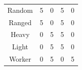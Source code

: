 \documentclass[a0,portrait]{a0poster}
\begin{document}
\begin{multicols}{2}
{\begin{center}
\begin{tabular}{|c|cc|cc|}
		Random              & 5                                      & 0                 & 5                                      & 0                 \\
		Ranged              & 5                                      & 0                 & 5                                      & 0                 \\
		Heavy               & 0                                      & 5                 & 5                                      & 0                 \\
		Light               & 0                                      & 5                 & 5                                      & 0                 \\
		Worker              & 0                                      & 5                 & 0                                      & 5                 \\ \hline
	\end{tabular}
\end{center}
}



\vspace{13mm}






\end{multicols}
\end{document}
